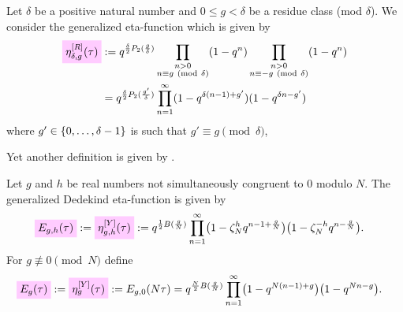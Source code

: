\documentclass{article}
\begin{document}
\begin{Definition}
\cite{Robins:GeneralizedDedekindEtaProducts:1994}
Let $\delta$ be a positive natural number and $0 \le g < \delta$ be a residue class
(mod $\delta$).
%
We consider the generalized eta-function which is given by
\begin{align}
  \defineNotation[eta-delta-g-tau-Robins]{\eta_{\delta,g}^{[R]}(\tau)}
  &:=
  q^{\frac{\delta}{2}P_2(\frac{g}{\delta})}
  \prod_{\substack{n>0\\n\equiv g\ (\mathrm{mod}\ \delta)}} (1-q^n)
  \prod_{\substack{n>0\\n\equiv -g\ (\mathrm{mod}\ \delta)}} (1-q^n)
  \notag\\
  &=
  q^{\frac{\delta}{2}P_2(\frac{g'}{\delta})}
  \prod_{n=1}^\infty (1-q^{\delta (n-1)+g'})(1-q^{\delta n-g'})
  \label{eq:eta_delta-g^[R](tau)}
\end{align}
where $g'\in\left\{0,\ldots,\delta-1\right\}$ is such that $g' \equiv g \pmod{\delta}$,
\end{Definition}


Yet another definition is given by
\cite{Yang:GeneralizedDedekindEtaFunctions:2004}.


\begin{Definition}
  \cite{Yang:GeneralizedDedekindEtaFunctions:2004}
  Let $g$ and $h$ be real numbers not simultaneously congruent to 0
  modulo $N$.
%
The generalized Dedekind eta-function is given by
\begin{align}
  \label{eq:eta_g-h^[Y](tau)}
  \defineNotation[E-g-h-tau]{E_{g,h}(\tau)}
  &:=
  \defineNotation[eta-g-h-tau-Yang]{\eta_{g,h}^{[Y]}(\tau)}
  :=
  q^{\frac{1}{2} B(\frac{g}{N})}
  \prod_{n=1}^\infty
    \bigl(1-\zeta_N^h q^{n-1 + \frac{g}{N}}\bigr)
    \bigl(1-\zeta_N^{-h} q^{n - \frac{g}{N}}\bigr).
\end{align}
For $g \not\equiv 0 \pmod{N}$ define
\begin{align}
  \label{eq:eta_g^[Y](tau)}
  \defineNotation[E-g-tau]{E_g(\tau)}
  &:=
  \defineNotation[eta-g-tau-Yang]{\eta_g^{[Y]}(\tau)}
  :=
  E_{g,0}(N \tau)
  =
  q^{\frac{N}{2} B(\frac{g}{N})}
  \prod_{n=1}^\infty
    \bigl(1-q^{N (n-1) + g}\bigr)
    \bigl(1-q^{N n - g}\bigr).
\end{align}
\end{Definition}
\end{document}
